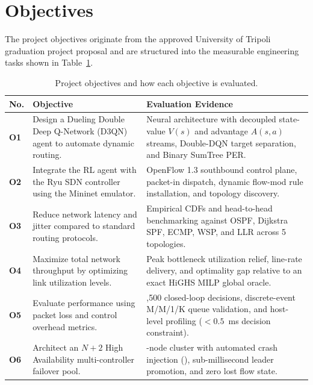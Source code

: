 \documentclass[12pt,a4paper,oneside]{report}
\newcommand{\code}[1]{\texttt{\detokenize{#1}}}
\begin{document}
\section{Objectives}
The project objectives originate from the approved University of Tripoli graduation project proposal and are structured into the measurable engineering tasks shown in Table~\ref{tab:project_objectives}.

\begin{table}[htbp]
\centering
\small
\caption{Project objectives and how each objective is evaluated.}
\label{tab:project_objectives}
\begin{tabularx}{\textwidth}{>{\bfseries}p{10mm}>{\raggedright\arraybackslash}p{48mm}>{\raggedright\arraybackslash}X}
\toprule
No. & Objective & Evaluation Evidence \\
\midrule
O1 & Design a Dueling Double Deep Q-Network (D3QN) agent to automate dynamic routing. & Neural architecture with decoupled state-value $V(s)$ and advantage $A(s, a)$ streams, Double-DQN target separation, and Binary SumTree PER. \\
O2 & Integrate the RL agent with the Ryu SDN controller using the Mininet emulator. & OpenFlow 1.3 southbound control plane, packet-in dispatch, dynamic flow-mod rule installation, and topology discovery. \\
O3 & Reduce network latency and jitter compared to standard routing protocols. & Empirical CDFs and head-to-head benchmarking against OSPF, Dijkstra SPF, ECMP, WSP, and LLR across 5 topologies. \\
O4 & Maximize total network throughput by optimizing link utilization levels. & Peak bottleneck utilization relief, line-rate delivery, and optimality gap relative to an exact HiGHS MILP global oracle. \\
O5 & Evaluate performance using packet loss and control overhead metrics. & 4,500 closed-loop decisions, discrete-event M/M/1/K queue validation, and host-level profiling ($<0.5$~ms decision constraint). \\
O6 & Architect an $N+2$ High Availability multi-controller failover pool. & 3-node cluster with automated crash injection (\code{SIGKILL}), sub-millisecond leader promotion, and zero lost flow state. \\
\bottomrule
\end{tabularx}
\end{table}
\end{document}
